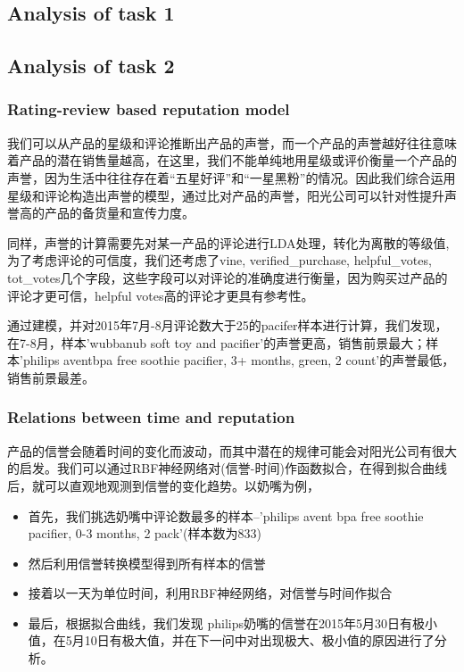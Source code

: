 \documentclass{mcmthesis}
\begin{document}
\subsection{Analysis of task 1}

\subsection{Analysis of task 2}
\subsubsection{Rating-review based reputation model}
我们可以从产品的星级和评论推断出产品的声誉，而一个产品的声誉越好往往意味着产品的潜在销售量越高，在这里，我们不能单纯地用星级或评价衡量一个产品的声誉，因为生活中往往存在着“五星好评”和“一星黑粉”的情况。因此我们综合运用星级和评论构造出声誉的模型，通过比对产品的声誉，阳光公司可以针对性提升声誉高的产品的备货量和宣传力度。

同样，声誉的计算需要先对某一产品的评论进行LDA处理，转化为离散的等级值, 为了考虑评论的可信度，我们还考虑了vine, verified\_purchase, helpful\_votes, tot\_votes几个字段，这些字段可以对评论的准确度进行衡量，因为购买过产品的评论才更可信，helpful votes高的评论才更具有参考性。

通过建模，并对2015年7月-8月评论数大于25的pacifer样本进行计算，我们发现，在7-8月，样本'wubbanub soft toy and pacifier'的声誉更高，销售前景最大；样本'philips aventbpa free soothie pacifier, 3+ months, green, 2 count'的声誉最低，销售前景最差。

\subsubsection{Relations between time and reputation}
产品的信誉会随着时间的变化而波动，而其中潜在的规律可能会对阳光公司有很大的启发。我们可以通过RBF神经网络\cite{}对(信誉-时间)作函数拟合，在得到拟合曲线后，就可以直观地观测到信誉的变化趋势。以奶嘴为例，
\begin{itemize}
	\item 首先，我们挑选奶嘴中评论数最多的样本--'philips avent bpa free soothie pacifier, 0-3 months, 2 pack'(样本数为833)
	\item 然后利用信誉转换模型得到所有样本的信誉
	\item 接着以一天为单位时间，利用RBF神经网络，对信誉与时间作拟合
	\item 最后，根据拟合曲线，我们发现
	philips奶嘴的信誉在2015年5月30日有极小值，在5月10日有极大值，并在下一问中对出现极大、极小值的原因进行了分析。
\end{itemize}
\end{document}
